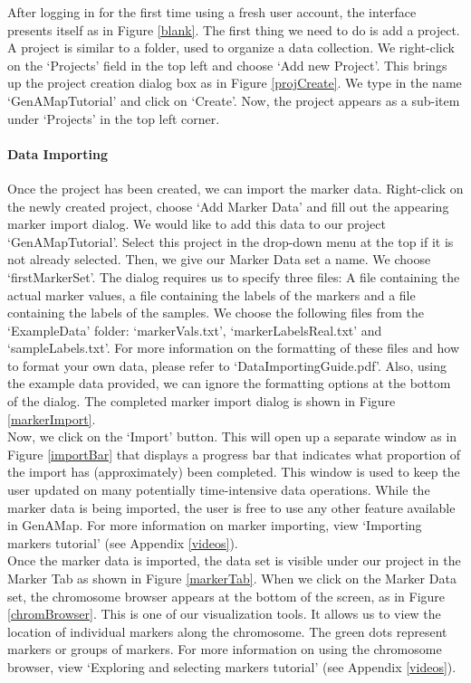 \documentclass{article}
\begin{document}
After logging in for the first time using a fresh user account, the interface presents itself as in Figure \ref{blank}. The first thing we need to do is add a project. A project is similar to a folder, used to organize a data collection. We right-click on the `Projects' field in the top left and choose `Add new Project'. This brings up the project creation dialog box as in Figure \ref{projCreate}. We type in the name `GenAMapTutorial' and click on `Create'. Now, the project appears as a sub-item under `Projects' in the top left corner.\\

\paragraph{Data Importing} Once the project has been created, we can import the marker data. Right-click on the newly created project, choose `Add Marker Data' and fill out the appearing marker import dialog. We would like to add this data to our project `GenAMapTutorial'. Select this project in the drop-down menu at the top if it is not already selected. Then, we give our Marker Data set a name. We choose `firstMarkerSet'. The dialog requires us to specify three files: A file containing the actual marker values, a file containing the labels of the markers and a file containing the labels of the samples. We choose the following files from the `ExampleData' folder: `markerVals.txt', `markerLabelsReal.txt' and `sampleLabels.txt'. For more information on the formatting of these files and how to format your own data, please refer to `DataImportingGuide.pdf'. Also, using the example data provided, we can ignore the formatting options at the bottom of the dialog. The completed marker import dialog is shown in Figure \ref{markerImport}. \\

Now, we click on the `Import' button. This will open up a separate window as in Figure \ref{importBar} that displays a progress bar that indicates what proportion of the import has (approximately) been completed. This window is used to keep the user updated on many potentially time-intensive data operations. While the marker data is being imported, the user is free to use any other feature available in GenAMap. For more information on marker importing, view `Importing markers tutorial' (see Appendix \ref{videos}).\\

Once the marker data is imported, the data set is visible under our project in the Marker Tab as shown in Figure \ref{markerTab}. When we click on the Marker Data set, the chromosome browser appears at the bottom of the screen, as in Figure \ref{chromBrowser}. This is one of our visualization tools. It allows us to view the location of individual markers along the chromosome. The green dots represent markers or groups of markers. For more information on using the chromosome browser, view `Exploring and selecting markers tutorial' (see Appendix \ref{videos}).\\
\end{document}
